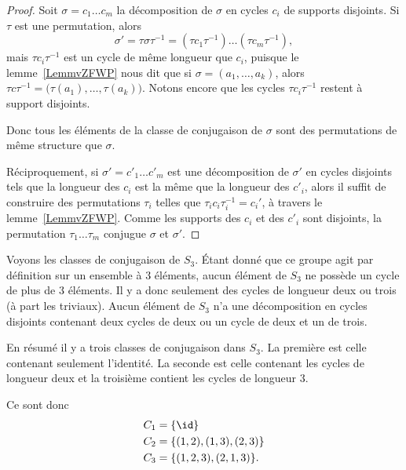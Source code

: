 \begin{proof}
    Soit \( \sigma=c_1\ldots c_m\) la décomposition de \( \sigma\) en cycles \( c_i\) de supports disjoints. Si \( \tau\) est une permutation, alors
    \begin{equation}
        \sigma'=\tau\sigma\tau^{-1}=(\tau c_1\tau^{-1})\ldots (\tau c_m\tau^{-1}),
    \end{equation}
    mais \( \tau c_i\tau^{-1}\) est un cycle de même longueur que \( c_i\), puisque le lemme~\ref{LemmvZFWP} nous dit que si \( \sigma=(a_1,\ldots, a_k)\), alors \( \tau c\tau^{-1}=\big( \tau(a_1),\ldots, \tau(a_k) \big)\). Notons encore que les cycles \( \tau c_i\tau^{-1}\) restent à support disjoints.

    Donc tous les éléments de la classe de conjugaison de \( \sigma\) sont des permutations de même structure que \( \sigma\).

    Réciproquement, si \( \sigma'=c'_1\ldots c'_m\) est une décomposition de \( \sigma'\) en cycles disjoints tels que la longueur des \( c_i\) est la même que la longueur des \( c'_i\), alors il suffit de construire des permutations \( \tau_i\) telles que \( \tau_i c_i\tau_i^{-1}=c_i'\), à travers le lemme~\ref{LemmvZFWP}. Comme les supports des $c_i$ et des $c'_i$ sont disjoints, la permutation \( \tau_1\ldots \tau_m\) conjugue \( \sigma\) et \( \sigma'\).
\end{proof}

\begin{example}     \label{EXooQAXRooBsPURs}
    Voyons les classes de conjugaison de \( S_3\). Étant donné que ce groupe agit par définition sur un ensemble à \( 3\) éléments, aucun élément de \( S_3\) ne possède un cycle de plus de \( 3\) éléments. Il y a donc seulement des cycles de longueur deux ou trois (à part les triviaux). Aucun élément de \( S_3\) n'a une décomposition en cycles disjoints contenant deux cycles de deux ou un cycle de deux et un de trois.

    En résumé il y a trois classes de conjugaison dans \( S_3\). La première est celle contenant seulement l'identité. La seconde est celle contenant les cycles de longueur deux et la troisième contient les cycles de longueur \( 3\).

    Ce sont donc
    \begin{subequations}
        \begin{align}
            C_1&=\{ \id \}\\
            C_2&=\{ (1,2),(1,3),(2,3) \}\\
            C_3&=\{ (1,2,3),(2,1,3) \}.
        \end{align}
    \end{subequations}
\end{example}

